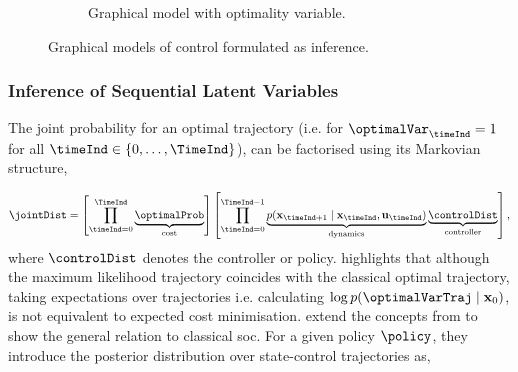 \documentclass{mimosis-class/mimosis}
\numberwithin{equation}{chapter}
\newcommand{\state}{\ensuremath{\mathbf{x}}}
\newcommand{\control}{\ensuremath{\mathbf{u}}}
\begin{document}
{\begin{figure}[t]
\begin{subfigure}{.48\textwidth}
{
    }
  \caption{Graphical model with optimality variable.}
\label{fig-augmented-control-graphical-model}
\end{subfigure}
\caption[Graphical models of control formulated as inference]{Graphical models of control formulated as inference.}
\label{fig-control-graphical-model}
\end{figure}

\subsubsection{Inference of Sequential Latent Variables}
\label{sec:orgd843025}
\newline

The joint probability for an optimal trajectory (i.e.
for \(\optimalVar_\timeInd=1\) for all \(\timeInd \in \{0,\ldots,\TimeInd\}\)),
can be factorised using its Markovian structure,

\small
\begin{align} \label{eq-traj-opt-joint-dist}
\jointDist =
\left[ \prod_{\timeInd=0}^{\TimeInd}
\underbrace{\optimalProb}_{\text{cost}} \right]
\left[ \prod_{\timeInd=0}^{\TimeInd-1}
\underbrace{p(\state_{\timeInd+1} \mid \state_\timeInd, \control_\timeInd)}_{\text{dynamics}}
\underbrace{\controlDist}_{\text{controller}} \right],
\end{align}
\normalsize
where \(\controlDist\) denotes the controller or policy.
\cite{toussaintRobot2009} highlights that although the maximum likelihood trajectory coincides with the classical
optimal trajectory, taking expectations over trajectories
i.e. calculating \(\log p(\optimalVarTraj \mid \state_0)\),
is not equivalent to expected cost minimisation.
\cite{rawlikStochastic2013} extend the concepts from  \cite{toussaintRobot2009} to show the general relation
to classical \acrshort{soc}.
For a given policy \(\policy\), they introduce the posterior distribution over state-control trajectories as,

}
\end{document}
